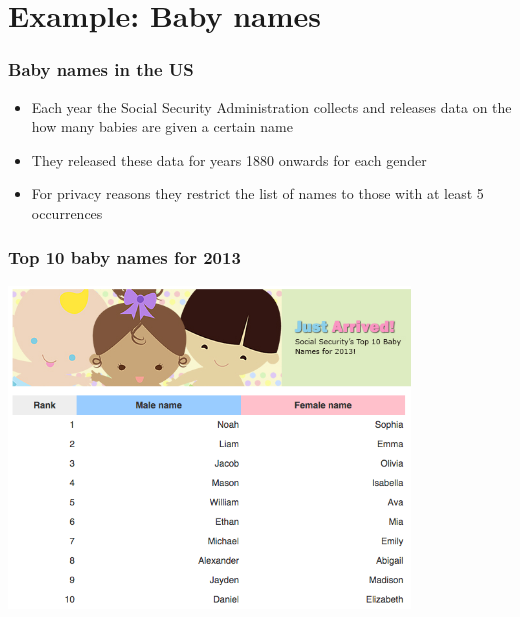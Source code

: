 \documentclass[11pt,containsverbatim,handout,xcolor=xelatex,dvipsnames,table]{beamer}
\begin{document}

\section{Example: Baby names}


\begin{frame}
\frametitle{Baby names in the US}

\begin{itemize}

\item Each year the Social Security Administration collects and releases data on the how many babies are given a certain name

\item They released these data for years 1880 onwards for each gender

\item For privacy reasons they restrict the list of names to those with at least 5 occurrences

\end{itemize}

\end{frame}


\begin{frame}
\frametitle{Top 10 baby names for 2013}

\begin{center}
\includegraphics[width=0.8\textwidth]{figures/babynames2013}
\end{center}


\end{frame}
\end{document}
